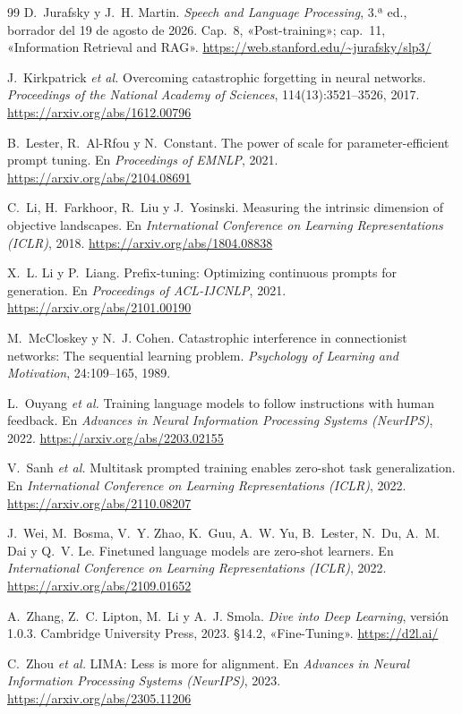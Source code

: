 \begin{thebibliography}{99}
D.~Jurafsky y J.~H. Martin.
\newblock \emph{Speech and Language Processing}, 3.ª ed., borrador del 19 de agosto de 2026.
\newblock Cap.~8, «Post-training»; cap.~11, «Information Retrieval and RAG».
\newblock \url{https://web.stanford.edu/~jurafsky/slp3/}

J.~Kirkpatrick \emph{et al.}
\newblock Overcoming catastrophic forgetting in neural networks.
\newblock \emph{Proceedings of the National Academy of Sciences}, 114(13):3521--3526, 2017.
\newblock \url{https://arxiv.org/abs/1612.00796}

B.~Lester, R.~Al-Rfou y N.~Constant.
\newblock The power of scale for parameter-efficient prompt tuning.
\newblock En \emph{Proceedings of EMNLP}, 2021.
\newblock \url{https://arxiv.org/abs/2104.08691}

C.~Li, H.~Farkhoor, R.~Liu y J.~Yosinski.
\newblock Measuring the intrinsic dimension of objective landscapes.
\newblock En \emph{International Conference on Learning Representations (ICLR)}, 2018.
\newblock \url{https://arxiv.org/abs/1804.08838}

X.~L. Li y P.~Liang.
\newblock Prefix-tuning: Optimizing continuous prompts for generation.
\newblock En \emph{Proceedings of ACL-IJCNLP}, 2021.
\newblock \url{https://arxiv.org/abs/2101.00190}

M.~McCloskey y N.~J. Cohen.
\newblock Catastrophic interference in connectionist networks: The sequential learning problem.
\newblock \emph{Psychology of Learning and Motivation}, 24:109--165, 1989.

L.~Ouyang \emph{et al.}
\newblock Training language models to follow instructions with human feedback.
\newblock En \emph{Advances in Neural Information Processing Systems (NeurIPS)}, 2022.
\newblock \url{https://arxiv.org/abs/2203.02155}

V.~Sanh \emph{et al.}
\newblock Multitask prompted training enables zero-shot task generalization.
\newblock En \emph{International Conference on Learning Representations (ICLR)}, 2022.
\newblock \url{https://arxiv.org/abs/2110.08207}

J.~Wei, M.~Bosma, V.~Y. Zhao, K.~Guu, A.~W. Yu, B.~Lester, N.~Du, A.~M. Dai y Q.~V. Le.
\newblock Finetuned language models are zero-shot learners.
\newblock En \emph{International Conference on Learning Representations (ICLR)}, 2022.
\newblock \url{https://arxiv.org/abs/2109.01652}

A.~Zhang, Z.~C. Lipton, M.~Li y A.~J. Smola.
\newblock \emph{Dive into Deep Learning}, versión 1.0.3.
\newblock Cambridge University Press, 2023. §14.2, «Fine-Tuning».
\newblock \url{https://d2l.ai/}

C.~Zhou \emph{et al.}
\newblock LIMA: Less is more for alignment.
\newblock En \emph{Advances in Neural Information Processing Systems (NeurIPS)}, 2023.
\newblock \url{https://arxiv.org/abs/2305.11206}

\end{thebibliography}
